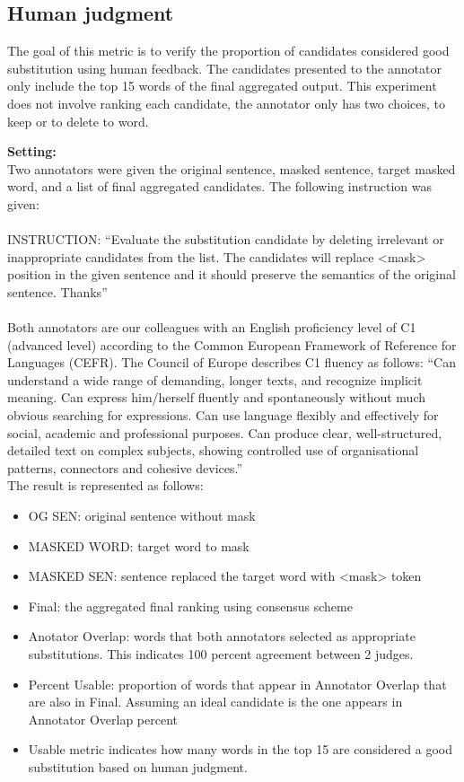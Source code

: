 \documentclass[12pt,oneside,openright,a4paper]{cpe-english-project}
\begin{document}
\subsection{Human judgment}

The goal of this metric is to verify the proportion of candidates considered good substitution using human feedback. The candidates presented to the annotator only include the top 15 words of the final aggregated output. This experiment does not involve ranking each candidate, the annotator only has two choices, to keep or to delete to word.

\textbf{Setting:}\\
Two annotators were given the original sentence, masked sentence, target masked word, and a list of final aggregated candidates. The following instruction was given:
\\\\
INSTRUCTION:
“Evaluate the substitution candidate by deleting irrelevant or inappropriate candidates from the list.
The candidates will replace <mask> position in the given sentence and it should preserve the semantics of the original sentence. Thanks”
\\\\
Both annotators are our colleagues with an English proficiency level of C1 (advanced level) according to the Common European Framework of Reference for Languages (CEFR). 
The Council of Europe describes C1 fluency as follows:
“Can understand a wide range of demanding, longer texts, and recognize implicit meaning. Can express him/herself fluently and spontaneously without much obvious searching for expressions. Can use language flexibly and effectively for social, academic and professional purposes. Can produce clear, well-structured, detailed text on complex subjects, showing controlled use of organisational patterns, connectors and cohesive devices.”\cite{q} 
\\
The result is represented as follows:
\begin{itemize}

\item OG SEN: original sentence without mask
\item MASKED WORD: target word to mask
\item MASKED SEN: sentence replaced the target word with <mask> token


\item Final: the aggregated final ranking using consensus scheme
\item Anotator Overlap: words that both annotators selected as appropriate substitutions. This indicates 100 percent agreement between 2 judges.
\item Percent Usable: proportion of words that appear in Annotator Overlap that are also in Final. Assuming an ideal candidate is the one appears in Annotator Overlap percent 
\item Usable metric indicates how many words in the top 15 are considered a good substitution based on human judgment. 
\end{itemize}
\end{document}
